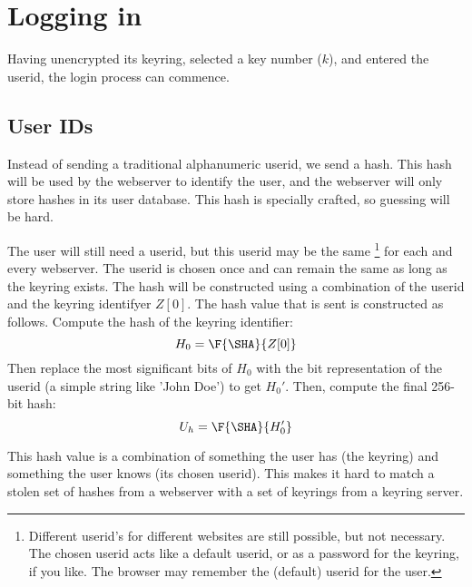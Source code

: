 %
%
%
\section{Logging in}
Having unencrypted its keyring, selected a key number ($k$), and entered the userid, the login process can commence.

\subsection{User IDs}
\label{sec:user_ids}
Instead of sending a traditional alphanumeric userid,
we send a hash.
This hash will be used by the webserver to identify the user,
and the webserver will only store hashes in its user database.
This hash is specially crafted,
so guessing will be hard.
\par
The user will still need a userid,
but this userid may be the same%
\footnote{Different userid's for different websites are still possible, but not necessary.
The chosen userid acts like a default userid, or as a password for the keyring, if you like.
The browser may remember the (default) userid for the user.}
for each and every webserver.
The userid is chosen once and can remain the same as long as the keyring exists.
The hash will be constructed using a combination of the userid and the keyring identifyer $Z[0]$.
The hash value that is sent is constructed as follows.
Compute the hash of the keyring identifier:
\[H_0=\F{\SHA}{Z[0]}\]
Then replace the most significant bits of $H_0$ with the bit representation of the userid
(a simple string like 'John Doe')
to get $H_0'$.
Then, compute the final 256-bit hash:
\[U_h=\F{\SHA}{H_0'}\]
\par
This hash value is a combination of something the user has
(the keyring)
and something the user knows
(its chosen userid).
This makes it hard to match a stolen set of hashes from a webserver with a set of keyrings from a keyring server.

